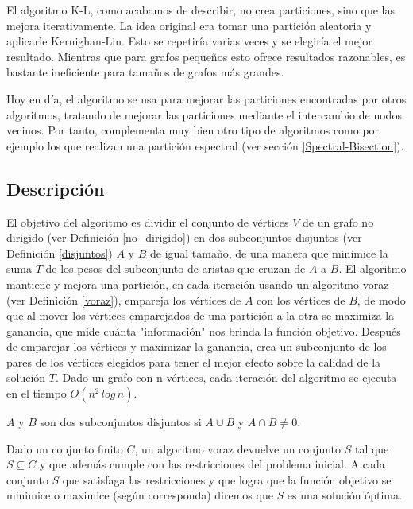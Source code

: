 El algoritmo K-L, como acabamos de describir, no crea particiones, sino que las mejora iterativamente. La idea original era tomar una partición aleatoria y aplicarle Kernighan-Lin\cite{KernighanLin}. Esto se repetiría varias veces y se elegiría el mejor resultado. Mientras que para grafos pequeños esto ofrece resultados razonables, es bastante ineficiente para tamaños de grafos más grandes.

Hoy en día, el algoritmo se usa para mejorar las particiones encontradas por otros algoritmos, tratando de mejorar las particiones mediante el intercambio de nodos vecinos. Por tanto, complementa muy bien otro tipo de algoritmos como por ejemplo los que realizan una partición espectral (ver sección \ref{Spectral-Bisection}).

\subsection{Descripción}

El objetivo del algoritmo es dividir el conjunto de vértices $V$ de un grafo no dirigido (ver Definición \ref{no_dirigido}) en dos subconjuntos disjuntos (ver Definición \ref{disjuntos}) $A$ y $B$ de igual tamaño, de una manera que minimice la suma $T$ de los pesos del subconjunto de aristas que cruzan de $A$ a $B$. El algoritmo mantiene y mejora una partición, en cada iteración usando un algoritmo voraz (ver Definición \ref{voraz}), empareja los vértices de $A$ con los vértices de $B$, de modo que al mover los vértices emparejados de una partición a la otra se maximiza la ganancia, que mide cuánta "información" nos brinda la función objetivo. Después de emparejar los vértices y maximizar la ganancia, crea un subconjunto de los pares de los vértices elegidos para tener el mejor efecto sobre la calidad de la solución $T$. Dado un grafo con n vértices, cada iteración del algoritmo se ejecuta en el tiempo $O({n}^2 \, log \, n)$.

\begin{mydef}\label{disjuntos}
	$A$ y $B$ son dos subconjuntos disjuntos si $A \cup B$ y $A \cap B \neq 0$.
\end{mydef}

\begin{mydef}\label{voraz}
	Dado un conjunto finito $C$, un algoritmo voraz devuelve un conjunto $S$ tal que $S\subseteq C$ y que además cumple con las restricciones del problema inicial. A cada conjunto $S$ que satisfaga las restricciones y que logra que la función objetivo se minimice o maximice (según corresponda) diremos que $S$ es una solución óptima. 
\end{mydef}

